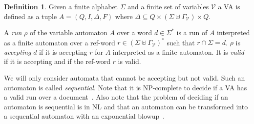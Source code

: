 \documentclass[12px]{article}
\theoremstyle{definition}
\newtheorem{definition}{Definition}
\begin{document}
        \begin{definition}
          Given a finite alphabet $\Sigma$ and a finite set of variables
          $\mathcal{V}$ a VA is defined as a tuple $A = (Q, I, \Delta, F)$
          where $\Delta \subseteq Q \times (\Sigma \uplus \Gamma_\mathcal{V})
          \times Q$.

          A \textit{run} $\rho$ of the variable automaton $A$ over a word $d
          \in \Sigma^*$ is a run of $A$ interpreted as a finite automaton over
          a ref-word $r \in {(\Sigma \uplus \Gamma_\mathcal{V})}^*$ such that
          $r \cap \Sigma = d$. $\rho$ is \textit{accepting} $d$ if it is
          accepting $r$ for $A$ interpreted as a finite automaton. It is
          \textit{valid} if it is accepting and if the ref-word $r$ is valid.
        \end{definition}



        We will only consider automata that cannot be accepting but not valid.
        Such an automaton is called \textit{sequential}. Note that it is
        NP-complete to decide if a VA has a valid run over a
        document~\cite{freydenberger:LIPIcs:2017}. Also note that the problem
        of deciding if an automaton is sequential is in NL and that an
        automaton can be transformed into a sequential automaton with an
        exponential blowup~\cite{ICDT19}.
\end{document}
